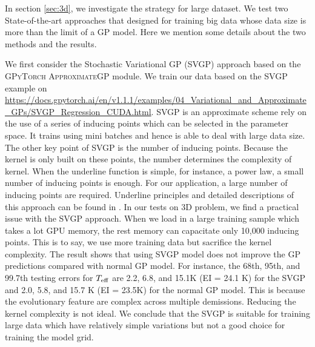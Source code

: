 In section \ref{sec:3d}, we investigate the strategy for large dataset. We test two State-of-the-art approaches that designed for training big data whose data size is more than the limit of a GP model. Here we mention some details about the two methods and the results. 

We first consider the Stochastic Variational GP (SVGP) approach based on the \textsc{GPyTorch ApproximateGP} module. 
We train our data based on the SVGP example on \url{https://docs.gpytorch.ai/en/v1.1.1/examples/04_Variational_and_Approximate_GPs/SVGP_Regression_CUDA.html}. 
SVGP is an approximate scheme rely on the use of a series of inducing points which can be selected in the parameter space. It trains using mini batches and hence is able to deal with large data size. The other key point of SVGP is the number of inducing points. Because the kernel is only built on these points, the number determines the complexity of kernel. When the underline function is simple, for instance, a power law, a small number of inducing points  is enough. For our application, a large number of inducing points are required. Underline principles and detailed descriptions of this approach can be found in \citet{hensman2015scalable}. In our tests on 3D problem, we find a practical issue with the SVGP approach. When we load in a large training sample which takes a lot GPU memory, the rest memory can capacitate only 10,000 inducing points. This is to say, we use more training data but sacrifice the kernel complexity.  The result shows that using SVGP model does not improve the GP predictions compared with normal GP model. For instance, the 68th, 95th, and 99.7th testing errors for $T_{\rm eff}$ are 2.2, 6.8, and 15.1K (EI = 24.1 K) for the SVGP and 2.0, 5.8, and 15.7 K (EI = 23.5K) for the normal GP model. This is because the evolutionary feature are complex across multiple demissions. Reducing the kernel complexity is not ideal. We conclude that the SVGP is suitable for training large data which have relatively simple variations but not a good choice for training the model grid.  

